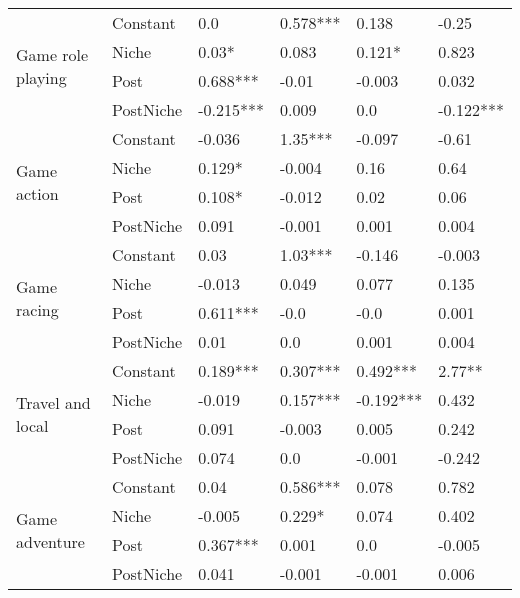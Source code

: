 \begin{longtable}[h!]{llllll}
\cline{1-6}
\multirow{4}{*}{Game role playing} & Constant &                 0.0 &    0.578*** &      0.138 &      -0.25 \\
          & Niche &               0.03* &       0.083 &     0.121* &      0.823 \\
          & Post &            0.688*** &       -0.01 &     -0.003 &      0.032 \\
          & PostNiche &           -0.215*** &       0.009 &        0.0 &  -0.122*** \\
\cline{1-6}
\multirow{4}{*}{Game action} & Constant &              -0.036 &     1.35*** &     -0.097 &      -0.61 \\
          & Niche &              0.129* &      -0.004 &       0.16 &       0.64 \\
          & Post &              0.108* &      -0.012 &       0.02 &       0.06 \\
          & PostNiche &               0.091 &      -0.001 &      0.001 &      0.004 \\
\cline{1-6}
\multirow{4}{*}{Game racing} & Constant &                0.03 &     1.03*** &     -0.146 &     -0.003 \\
          & Niche &              -0.013 &       0.049 &      0.077 &      0.135 \\
          & Post &            0.611*** &        -0.0 &       -0.0 &      0.001 \\
          & PostNiche &                0.01 &         0.0 &      0.001 &      0.004 \\
\cline{1-6}
\multirow{4}{*}{Travel and local} & Constant &            0.189*** &    0.307*** &   0.492*** &     2.77** \\
          & Niche &              -0.019 &    0.157*** &  -0.192*** &      0.432 \\
          & Post &               0.091 &      -0.003 &      0.005 &      0.242 \\
          & PostNiche &               0.074 &         0.0 &     -0.001 &     -0.242 \\
\cline{1-6}
\multirow{4}{*}{Game adventure} & Constant &                0.04 &    0.586*** &      0.078 &      0.782 \\
          & Niche &              -0.005 &      0.229* &      0.074 &      0.402 \\
          & Post &            0.367*** &       0.001 &        0.0 &     -0.005 \\
          & PostNiche &               0.041 &      -0.001 &     -0.001 &      0.006 \\

\end{longtable}
